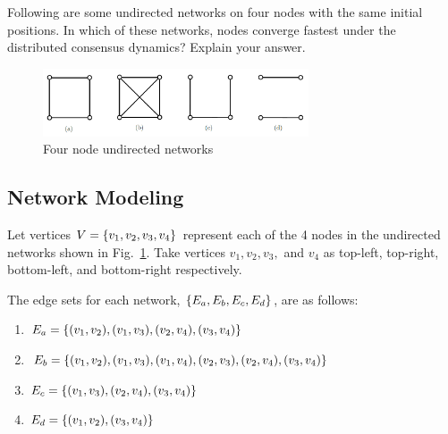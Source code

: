 \documentclass[]{article}
\numberwithin{equation}{section}
\renewcommand{\figurename}{Fig.}
\begin{document}
\newpage
\section{}
Following are some undirected networks on four nodes with the same initial positions.
In which of these networks, nodes converge fastest under the distributed consensus dynamics? 
Explain your answer.

\begin{figure}[h]
	\centering
	\includegraphics[width=0.7\textwidth]{figs/pblm7.png}
	\caption{Four node undirected networks}
	\label{fig:pblm7}
\end{figure}

\subsection{Network Modeling}
Let vertices $V = \qty{v_1, v_2, v_3, v_4}$ represent each of the 4 nodes in the undirected networks shown in \figurename \ \ref{fig:pblm7}.
Take vertices $v_1, v_2, v_3,$ and $v_4$ as top-left, top-right, bottom-left, and bottom-right respectively.

The edge sets for each network, $\qty{E_a, E_b, E_c, E_d}$, are as follows:
\begin{enumerate}
	\item $E_a = \qty{(v_1,v_2), (v_1, v_3), (v_2,v_4), (v_3,v_4)}$
	\item $E_b = \qty{(v_1,v_2), (v_1, v_3), (v_1,v_4), (v_2,v_3), (v_2,v_4), (v_3,v_4)}$
	\item $E_c = \qty{(v_1, v_3), (v_2,v_4), (v_3,v_4)}$
	\item $E_d = \qty{(v_1,v_2), (v_3,v_4)}$
\end{enumerate}
\end{document}
